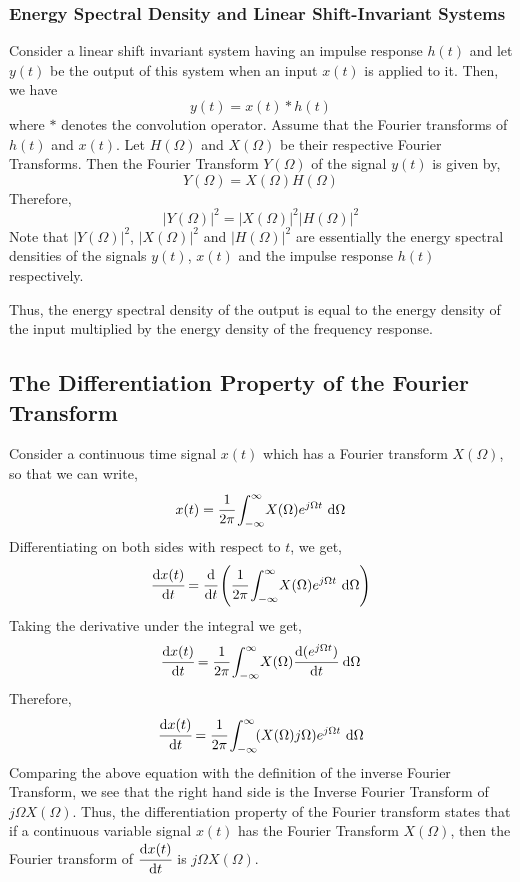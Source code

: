 	\subsubsection{Energy Spectral Density and Linear Shift-Invariant Systems}
		Consider a linear shift invariant system having an impulse response $h(t)$ and let $y(t)$ be the output  of this system when an input $x(t)$ is applied to it. Then, we have
		\begin{equation*}
			y(t) = x(t)*h(t)
		\end{equation*}
		where $*$ denotes the convolution operator. Assume that the Fourier transforms of $h(t)$ and $x(t)$. Let $H(\Omega)$ and $X(\Omega)$ be their respective Fourier Transforms. Then the Fourier Transform $Y(\Omega)$ of the signal $y(t)$ is given by,
		\begin{equation*}
			Y(\Omega) = X(\Omega)H(\Omega)
		\end{equation*}
		Therefore,
		\begin{equation*}
			|Y(\Omega)|^2 = |X(\Omega)|^2|H(\Omega)|^2
		\end{equation*}
		Note that $|Y(\Omega)|^2$, $|X(\Omega)|^2$ and $|H(\Omega)|^2$ are essentially the energy spectral densities of the signals $y(t)$, $x(t)$ and the impulse response $h(t)$ respectively.

		\noindent
		Thus, the energy spectral density of the output is equal to the energy density of the input multiplied by the energy density of the frequency response.
\subsection{The Differentiation Property of the Fourier Transform}
Consider a continuous time signal $x(t)$ which has a Fourier transform $X(\Omega)$, so that we can write,
\begin{equation*}
	x(t) = \cfrac{1}{2\pi}\int_{-\infty}^{\infty} \! X(\Omega)e^{j\Omega t} \ \mathrm{d} \Omega
\end{equation*}
Differentiating on both sides with respect to $t$, we get,
\begin{equation*}
	\cfrac{\mathrm{d} x(t)}{\mathrm{d} t} = \cfrac{\mathrm{d}}{\mathrm{d} t}\left(\cfrac{1}{2\pi}\int_{-\infty}^{\infty} \! X(\Omega)e^{j\Omega t} \ \mathrm{d} \Omega\right)
\end{equation*}
Taking the derivative under the integral we get,
\begin{equation*}
	\cfrac{\mathrm{d} x(t)}{\mathrm{d} t} = \cfrac{1}{2\pi}\int_{-\infty}^{\infty} \! X(\Omega)\cfrac{\mathrm{d} (e^{j\Omega t})}{\mathrm{d} t} \ \mathrm{d} \Omega
\end{equation*}
Therefore,
\begin{equation*}
	\cfrac{\mathrm{d} x(t)}{\mathrm{d} t} = \cfrac{1}{2\pi}\int_{-\infty}^{\infty} \! (X(\Omega)j\Omega) e^{j\Omega t} \ \mathrm{d} \Omega
\end{equation*}
Comparing the above equation with the definition of the inverse Fourier Transform, we see that the right hand side is the Inverse Fourier Transform of $j\Omega X(\Omega)$. Thus, the differentiation property of the Fourier transform states that if a continuous variable signal $x(t)$ has the Fourier Transform $X(\Omega)$, then the Fourier transform of $\cfrac{\mathrm{d} x(t)}{\mathrm{d} t}$ is $j\Omega X(\Omega)$.
